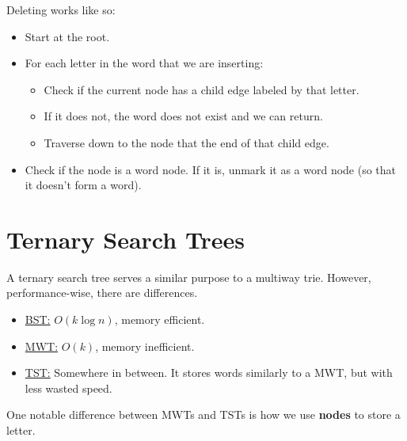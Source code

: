 \documentclass[letterpaper]{article}
\begin{document}
Deleting works like so: 
\begin{itemize}
    \item Start at the root. 
    \item For each letter in the word that we are inserting: 
    \begin{itemize}
        \item Check if the current node has a child edge labeled by that letter. 
        \item If it does not, the word does not exist and we can return. 
        \item Traverse down to the node that the end of that child edge. 
    \end{itemize}
    \item Check if the node is a word node. If it is, unmark it as a word node (so that it doesn't form a word). 
\end{itemize}














\newpage 
\section{Ternary Search Trees}
A ternary search tree serves a similar purpose to a multiway trie. However, performance-wise, there are differences. 
\begin{itemize}
    \item \underline{BST:} $O(k \log n)$, memory efficient. 
    \item \underline{MWT:} $O(k)$, memory inefficient. 
    \item \underline{TST:} Somewhere in between. It stores words similarly to a MWT, but with less wasted speed. 
\end{itemize}
One notable difference between MWTs and TSTs is how we use \textbf{nodes} to store a letter.
\end{document}
